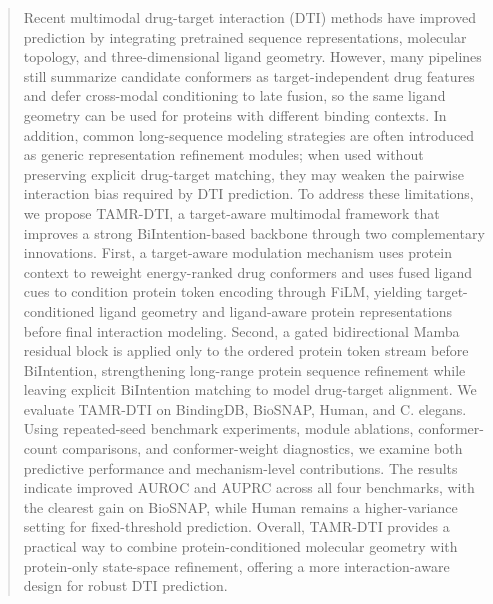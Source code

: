 \begin{abstract}
Recent multimodal drug-target interaction (DTI) methods have improved
prediction by integrating pretrained sequence representations, molecular
topology, and three-dimensional ligand geometry. However, many pipelines still
summarize candidate conformers as target-independent drug features and defer
cross-modal conditioning to late fusion, so the same ligand geometry can be
used for proteins with different binding contexts. In addition, common
long-sequence modeling strategies are often introduced as generic
representation refinement modules; when used without preserving explicit
drug-target matching, they may weaken the pairwise interaction bias required
by DTI prediction. To address these limitations, we propose TAMR-DTI, a
target-aware multimodal framework that improves a strong BiIntention-based
backbone through two complementary innovations. First, a target-aware
modulation mechanism uses protein context to reweight energy-ranked drug
conformers and uses fused ligand cues to condition protein token encoding
through FiLM, yielding target-conditioned ligand geometry and ligand-aware
protein representations before final interaction modeling. Second, a gated
bidirectional Mamba residual block is applied only to the ordered protein
token stream before BiIntention, strengthening long-range protein sequence
refinement while leaving explicit BiIntention matching to model drug-target
alignment. We evaluate TAMR-DTI on BindingDB, BioSNAP, Human, and C. elegans.
Using repeated-seed benchmark experiments, module ablations, conformer-count
comparisons, and conformer-weight diagnostics, we examine both predictive
performance and mechanism-level contributions. The results indicate improved
AUROC and AUPRC across all four benchmarks, with the clearest gain on BioSNAP,
while Human remains a higher-variance setting for fixed-threshold prediction.
Overall, TAMR-DTI provides a practical way to combine protein-conditioned
molecular geometry with protein-only state-space refinement, offering a more
interaction-aware design for robust DTI prediction.
\end{abstract}
